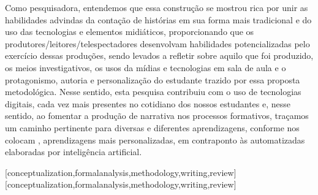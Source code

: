 \documentclass[portuguese]{textolivre}
\begin{document}
Como pesquisadora, entendemos que essa construção se mostrou rica por unir as habilidades advindas da contação de histórias em sua forma mais tradicional e do uso das tecnologias e elementos midiáticos, proporcionando que os produtores/leitores/telespectadores desenvolvam habilidades potencializadas pelo exercício dessas produções, sendo levados a refletir sobre aquilo que foi produzido, os meios investigativos, os usos da mídias e tecnologias em sala de aula e o protagonismo, autoria e personalização do estudante trazido por essa proposta metodológica. Nesse sentido, esta pesquisa contribuiu com o uso de tecnologias digitais, cada vez mais presentes no cotidiano dos nossos estudantes e, nesse sentido, ao fomentar a produção de narrativa nos processos formativos, traçamos um caminho pertinente para diversas e diferentes aprendizagens, conforme nos colocam \textcite{rodrigues2023para}, aprendizagens mais personalizadas, em contraponto às automatizadas elaboradas por inteligência artificial.



\printbibliography\label{sec-bib}
\begin{contributors}
[conceptualization,formalanalysis,methodology,writing,review]
[conceptualization,formalanalysis,methodology,writing,review]
\end{contributors}
\end{document}
